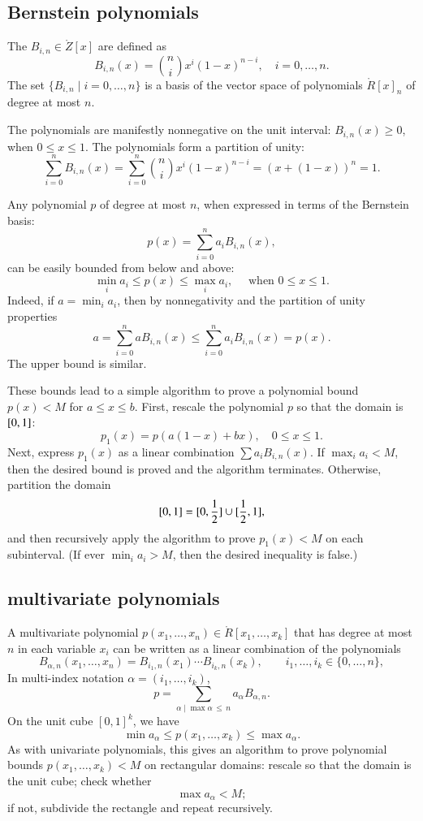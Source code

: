 \subsection{Bernstein polynomials}

The  $B_{i,n}\in\ring{Z}[x]$ are defined as
\begin{equation}
B_{i,n}(x) = {n\choose i} x^i (1-x)^{n-i},\quad i=0,\ldots,n.
\end{equation}
The set $\{B_{i,n}\mid i=0,\ldots,n\}$ is a basis of the vector space
of polynomials $\ring{R}[x]_n$ of degree at most $n$.

The polynomials are manifestly nonnegative on the unit interval:
$B_{i,n}(x)\ge 0$, when $0\le x\le 1$.  The polynomials form a
partition of unity:
\[
\sum_{i=0}^n B_{i,n}(x) = \sum_{i=0}^n {n\choose i} x^i (1-x)^{n-i} = 
(x + (1-x))^n = 1.
\]

Any polynomial $p$ of degree at most $n$, 
when expressed in terms of the Bernstein basis:
\[
p(x) =  \sum_{i=0}^n a_i B_{i,n}(x),
\]
can be easily bounded from below and above:
\[
\min_i a_i \le p(x) \le \max_i a_i,\quad\text{ when } 0 \le x \le 1.
\]
Indeed, if $a = \min_i a_i$, then by nonnegativity and the partition
of unity properties
\[
a  =  \sum_{i=0}^n a B_{i,n}(x) \le \sum_{i=0}^n a_i B_{i,n}(x) = p(x).
\]
The upper bound is similar.

These bounds lead to a simple algorithm to prove a polynomial bound
$p(x) < M$ for $a\le x\le b$.  First, rescale the polynomial $p$ so
that the domain is $[ 0,1]$:
\[
p_1(x) = p(a (1-x) + b x), \quad 0\le x \le 1.
\]
Next, express $p_1(x)$ as a linear combination $\sum a_i B_{i,n}(x)$.
If $\max_i a_i < M$, then the desired bound is proved and the algorithm
terminates.  Otherwise,
 partition the domain
\[
[ 0,1] = [  0,\frac{1}{2}]
\cup [  \frac{1}{2},1],
\]
and then recursively apply the algorithm to prove $p_1(x)<M$ on each
subinterval.   (If ever $\min_i a_i > M$, then the desired inequality is false.)


\subsection{multivariate polynomials}

A multivariate polynomial $p(x_1,\ldots,x_n)\in \ring{R}[x_1,\ldots,x_k]$ that
has degree at most $n$ in each variable $x_i$ can be written as a linear
combination of the polynomials
\[
B_{\alpha,n}(x_1,\ldots,x_n)=B_{i_1,n}(x_1)\cdots B_{i_k,n}(x_k),\qquad
 i_1,\ldots,i_k\in \{0,\ldots,n\},
\]
In multi-index notation $\alpha=(i_1,\ldots,i_k)$, 
\[
p = \sum_{\alpha\mid \max{\alpha}\,\le\, n} a_\alpha B_{\alpha,n}.
\]
On the unit cube $[0,1]^k$, we have
\[
\min a_\alpha \le p(x_1,\ldots,x_k) \le \max a_\alpha.
\]
As with univariate polynomials, this gives an algorithm to prove
polynomial bounds $p(x_1,\ldots,x_k)<M$ on rectangular domains:
rescale so that the domain is the unit cube; check whether
\[
\max a_\alpha < M;
\]
if not, subdivide the rectangle and repeat recursively.



